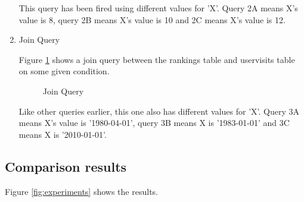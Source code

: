 \documentclass[9pt,twocolumn,twoside]{../../styles/osajnl}
\begin{document}
\begin{enumerate}
This query has been fired using different values for 'X'. Query 2A
means X's value is 8, query 2B means X's value is 10 and 2C means X's
value is 12.

\item Join Query

Figure \ref{fig:joinquery} shows a join query between the rankings
table and uservisits table on some given condition.

\begin{figure}[htbp]
\centering
{}
\caption{\cite{www-benchmarks-bigguery} Join Query}
\label{fig:joinquery}
\end{figure}

Like other queries earlier, this one also has different values for
'X'. Query 3A means X's value is ’1980-04-01’, query 3B means X is
’1983-01-01’ and 3C means X is ’2010-01-01’.

\end{enumerate}

\subsection{Comparison results}
\noindent
Figure \ref{fig:experiments} shows the results.
\end{document}
